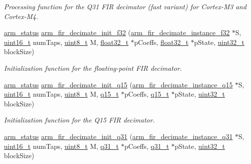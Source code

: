 \begin{DoxyCompactItemize}
\begin{DoxyCompactList}\small\item\em Processing function for the Q31 F\-I\-R decimator (fast variant) for Cortex-\/\-M3 and Cortex-\/\-M4. \end{DoxyCompactList}\item 
\hyperlink{arm__math_8h_a5e459c6409dfcd2927bb8a57491d7cf6}{arm\-\_\-status} \hyperlink{group___f_i_r__decimate_gaaa2524b08220fd6c3f753e692ffc7d3b}{arm\-\_\-fir\-\_\-decimate\-\_\-init\-\_\-f32} (\hyperlink{structarm__fir__decimate__instance__f32}{arm\-\_\-fir\-\_\-decimate\-\_\-instance\-\_\-f32} $\ast$S, \hyperlink{stdint_8h_a273cf69d639a59973b6019625df33e30}{uint16\-\_\-t} num\-Taps, \hyperlink{stdint_8h_aba7bc1797add20fe3efdf37ced1182c5}{uint8\-\_\-t} M, \hyperlink{arm__math_8h_a4611b605e45ab401f02cab15c5e38715}{float32\-\_\-t} $\ast$p\-Coeffs, \hyperlink{arm__math_8h_a4611b605e45ab401f02cab15c5e38715}{float32\-\_\-t} $\ast$p\-State, \hyperlink{stdint_8h_a435d1572bf3f880d55459d9805097f62}{uint32\-\_\-t} block\-Size)
\begin{DoxyCompactList}\small\item\em Initialization function for the floating-\/point F\-I\-R decimator. \end{DoxyCompactList}\item 
\hyperlink{arm__math_8h_a5e459c6409dfcd2927bb8a57491d7cf6}{arm\-\_\-status} \hyperlink{group___f_i_r__decimate_gada660e54b93d5d32178c6f5e1c6f368d}{arm\-\_\-fir\-\_\-decimate\-\_\-init\-\_\-q15} (\hyperlink{structarm__fir__decimate__instance__q15}{arm\-\_\-fir\-\_\-decimate\-\_\-instance\-\_\-q15} $\ast$S, \hyperlink{stdint_8h_a273cf69d639a59973b6019625df33e30}{uint16\-\_\-t} num\-Taps, \hyperlink{stdint_8h_aba7bc1797add20fe3efdf37ced1182c5}{uint8\-\_\-t} M, \hyperlink{arm__math_8h_ab5a8fb21a5b3b983d5f54f31614052ea}{q15\-\_\-t} $\ast$p\-Coeffs, \hyperlink{arm__math_8h_ab5a8fb21a5b3b983d5f54f31614052ea}{q15\-\_\-t} $\ast$p\-State, \hyperlink{stdint_8h_a435d1572bf3f880d55459d9805097f62}{uint32\-\_\-t} block\-Size)
\begin{DoxyCompactList}\small\item\em Initialization function for the Q15 F\-I\-R decimator. \end{DoxyCompactList}\item 
\hyperlink{arm__math_8h_a5e459c6409dfcd2927bb8a57491d7cf6}{arm\-\_\-status} \hyperlink{group___f_i_r__decimate_ga9ed47c4e0f58affa935d84e0508a7f39}{arm\-\_\-fir\-\_\-decimate\-\_\-init\-\_\-q31} (\hyperlink{structarm__fir__decimate__instance__q31}{arm\-\_\-fir\-\_\-decimate\-\_\-instance\-\_\-q31} $\ast$S, \hyperlink{stdint_8h_a273cf69d639a59973b6019625df33e30}{uint16\-\_\-t} num\-Taps, \hyperlink{stdint_8h_aba7bc1797add20fe3efdf37ced1182c5}{uint8\-\_\-t} M, \hyperlink{arm__math_8h_adc89a3547f5324b7b3b95adec3806bc0}{q31\-\_\-t} $\ast$p\-Coeffs, \hyperlink{arm__math_8h_adc89a3547f5324b7b3b95adec3806bc0}{q31\-\_\-t} $\ast$p\-State, \hyperlink{stdint_8h_a435d1572bf3f880d55459d9805097f62}{uint32\-\_\-t} block\-Size)

\end{DoxyCompactItemize}
